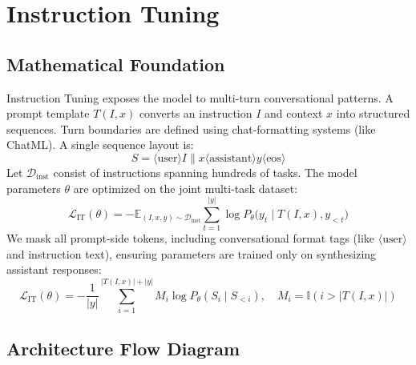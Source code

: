 \documentclass{article}
\begin{document}
\newpage
\section{Instruction Tuning}

\subsection{Mathematical Foundation}
Instruction Tuning exposes the model to multi-turn conversational patterns. A prompt template $T(I, x)$ converts an instruction $I$ and context $x$ into structured sequences. Turn boundaries are defined using chat-formatting systems (like ChatML). A single sequence layout is:
\begin{equation}
  S = \langle\text{user}\rangle I \parallel x \langle\text{assistant}\rangle y \langle\text{eos}\rangle
\end{equation}
Let $\mathcal{D}_{\text{inst}}$ consist of instructions spanning hundreds of tasks. The model parameters $\theta$ are optimized on the joint multi-task dataset:
\begin{equation}
  \mathcal{L}_{\text{IT}}(\theta) = -\mathbb{E}_{(I, x, y) \sim \mathcal{D}_{\text{inst}}} \sum_{t=1}^{|y|} \log P_\theta\bigl(y_t \mid T(I, x), y_{<t}\bigr)
\end{equation}
We mask all prompt-side tokens, including conversational format tags (like $\langle\text{user}\rangle$ and instruction text), ensuring parameters are trained only on synthesizing assistant responses:
\begin{equation}
  \mathcal{L}_{\text{IT}}(\theta) = -\frac{1}{|y|} \sum_{i=1}^{|T(I,x)|+|y|} M_i \log P_\theta(S_i \mid S_{<i}), \quad M_i = \mathbb{I}(i > |T(I, x)|)
\end{equation}

\subsection{Architecture Flow Diagram}
\end{document}
